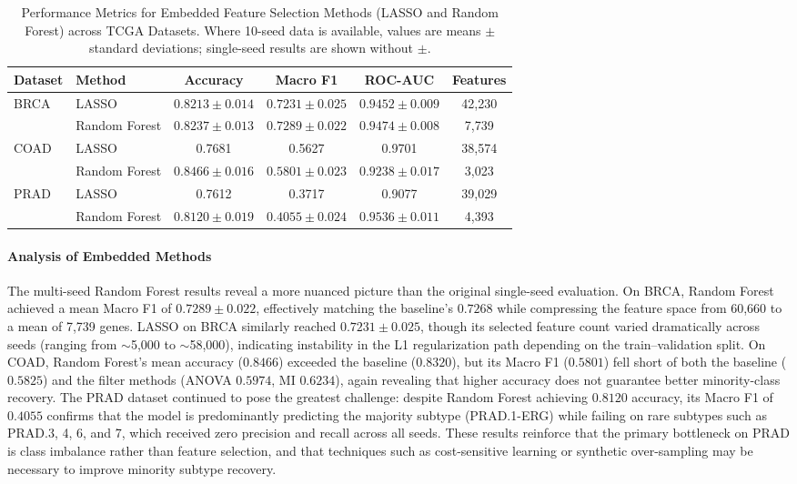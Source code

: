 \documentclass{article}
\begin{document}
\begin{table}[htbp]
\centering
\caption{Performance Metrics for Embedded Feature Selection Methods (LASSO and Random Forest) across TCGA Datasets. Where 10-seed data is available, values are means $\pm$ standard deviations; single-seed results are shown without $\pm$.}
\label{tab:embedded_metrics}
\begin{tabular}{@{}llcccc@{}}
\toprule
\textbf{Dataset} & \textbf{Method} & \textbf{Accuracy} & \textbf{Macro F1} & \textbf{ROC-AUC} & \textbf{Features} \\ \midrule
\multirow{2}{*}{BRCA} & LASSO          & $0.8213 \pm 0.014$ & $0.7231 \pm 0.025$ & $0.9452 \pm 0.009$ & 42,230 \\
                      & Random Forest  & $0.8237 \pm 0.013$ & $0.7289 \pm 0.022$ & $0.9474 \pm 0.008$ & 7,739  \\ \midrule
\multirow{2}{*}{COAD} & LASSO          & 0.7681  & 0.5627  & 0.9701  & 38,574 \\
                      & Random Forest  & $0.8466 \pm 0.016$ & $0.5801 \pm 0.023$ & $0.9238 \pm 0.017$ & 3,023  \\ \midrule
\multirow{2}{*}{PRAD} & LASSO          & 0.7612  & 0.3717  & 0.9077  & 39,029 \\
                      & Random Forest  & $0.8120 \pm 0.019$ & $0.4055 \pm 0.024$ & $0.9536 \pm 0.011$ & 4,393  \\ \bottomrule
\end{tabular}
\end{table}

\paragraph{Analysis of Embedded Methods}
The multi-seed Random Forest results reveal a more nuanced picture than the original single-seed evaluation. On BRCA, Random Forest achieved a mean Macro F1 of $0.7289 \pm 0.022$, effectively matching the baseline's $0.7268$ while compressing the feature space from 60,660 to a mean of 7,739 genes. LASSO on BRCA similarly reached $0.7231 \pm 0.025$, though its selected feature count varied dramatically across seeds (ranging from $\sim$5,000 to $\sim$58,000), indicating instability in the L1 regularization path depending on the train--validation split. On COAD, Random Forest's mean accuracy ($0.8466$) exceeded the baseline ($0.8320$), but its Macro F1 ($0.5801$) fell short of both the baseline ($0.5825$) and the filter methods (ANOVA $0.5974$, MI $0.6234$), again revealing that higher accuracy does not guarantee better minority-class recovery. The PRAD dataset continued to pose the greatest challenge: despite Random Forest achieving $0.8120$ accuracy, its Macro F1 of $0.4055$ confirms that the model is predominantly predicting the majority subtype (PRAD.1-ERG) while failing on rare subtypes such as PRAD.3, 4, 6, and 7, which received zero precision and recall across all seeds. These results reinforce that the primary bottleneck on PRAD is class imbalance rather than feature selection, and that techniques such as cost-sensitive learning or synthetic over-sampling may be necessary to improve minority subtype recovery.
\end{document}
